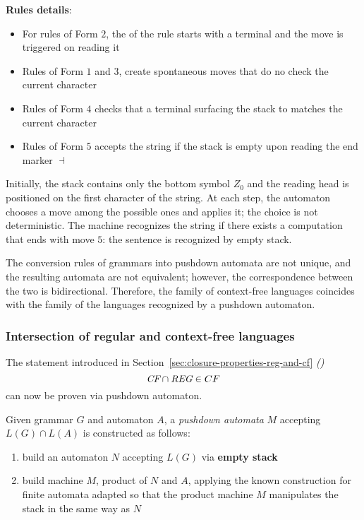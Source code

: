 \documentclass[english]{article}
\begin{document}
\bigskip
\textbf{Rules details}:

\begin{itemize}
  \item For rules of Form \(2\), the \RP of the rule starts with a terminal and the move is triggered on reading it
  \item Rules of Form \(1\) and \(3\), create spontaneous moves that do no check the current character
  \item Rules of Form \(4\) checks that a terminal surfacing the stack to matches the current character
  \item Rules of Form \(5\) accepts the string if the stack is empty upon reading the end marker \(\dashv\)
\end{itemize}

Initially, the stack contains only the bottom symbol \(Z_0\) and the reading head is positioned on the first character of the string.
At each step, the automaton chooses a move among the possible ones and applies it; the choice is not deterministic.
The machine recognizes the string if there exists a computation that ends with move \(5\): the sentence is recognized by empty stack.

The conversion rules of grammars into pushdown automata are not unique, and the resulting automata are not equivalent;
however, the correspondence between the two is bidirectional.
Therefore, the family of context-free languages \CF coincides with the family of the languages recognized by a pushdown automaton.

\subsubsection{Intersection of regular and context-free languages}
\label{sec:intersection-of-regular-and-context-free-languages}

The statement introduced in Section~\ref{sec:closure-properties-reg-and-cf} \textit{()}
\[ \textit{CF} \cap \textit{REG} \in CF \]
can now be proven via pushdown automaton.

Given grammar \(G\) and automaton \(A\), a \textit{pushdown automata} \(M\) accepting \(L(G) \cap L(A)\) is constructed as follows:

\begin{enumerate}
  \item build an automaton \(N\) accepting \(L(G)\) via \textbf{empty stack}
  \item build machine \(M\), product of \(N\) and \(A\), applying the known construction for finite automata adapted so that the product machine \(M\) manipulates the stack in the same way as \(N\)
\end{enumerate}
\end{document}

